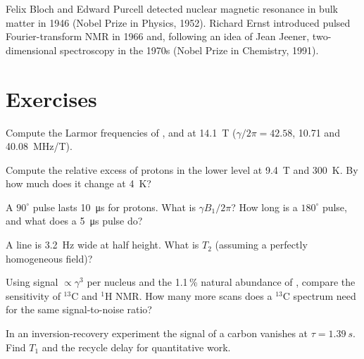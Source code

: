 \begin{history}
Felix Bloch and Edward Purcell detected nuclear magnetic resonance in bulk
matter in 1946 (Nobel Prize in Physics, 1952). Richard Ernst introduced pulsed
Fourier-transform NMR in 1966 and, following an idea of Jean Jeener,
two-dimensional spectroscopy in the 1970s (Nobel Prize in Chemistry, 1991).
\end{history}

\section{Exercises}

\begin{exercise}[$\star$]\label{exo:b3:advanced-nmr:1}
Compute the Larmor frequencies of ,  and  at \qty{14.1}{T}
($\gamma/2\pi = 42.58$, 10.71 and \qty{40.08}{MHz/T}).
\end{exercise}

\begin{exercise}[$\star$]\label{exo:b3:advanced-nmr:2}
Compute the relative excess of protons in the lower level at \qty{9.4}{T} and
\qty{300}{K}. By how much does it change at \qty{4}{K}?
\end{exercise}

\begin{exercise}[$\star$]\label{exo:b3:advanced-nmr:3}
A $90^\circ$ pulse lasts \qty{10}{\micro s} for protons. What is $\gamma B_1/2\pi$? How long is a
$180^\circ$ pulse, and what does a \qty{5}{\micro s} pulse do?
\end{exercise}

\begin{exercise}[$\star$]\label{exo:b3:advanced-nmr:4}
A line is \qty{3.2}{Hz} wide at half height. What is $T_2$ (assuming a perfectly
homogeneous field)?
\end{exercise}

\begin{exercise}[$\star\star$]\label{exo:b3:advanced-nmr:5}
Using signal $\propto\gamma^3$ per nucleus and the 1.1\,\% natural abundance of
, compare the sensitivity of ${}^{13}$C and ${}^1$H NMR. How many more scans
does a ${}^{13}$C spectrum need for the same signal-to-noise ratio?
\end{exercise}

\begin{exercise}[$\star\star$]\label{exo:b3:advanced-nmr:6}
In an inversion-recovery experiment the signal of a carbon vanishes at
$\tau = \qty{1.39}{s}$. Find $T_1$ and the recycle delay for quantitative work.
\end{exercise}

